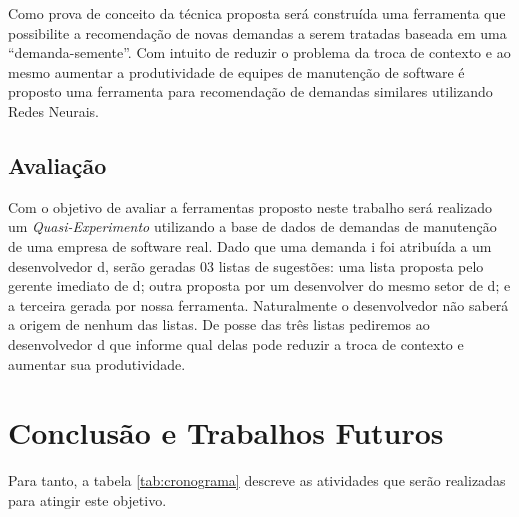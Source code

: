 \documentclass[msc,proposal,hidelot,hideabstract]{ppgccufmg} %
\begin{document}
Como prova de conceito da técnica proposta será construída uma ferramenta que
possibilite a recomendação de novas demandas a serem tratadas baseada em uma
``demanda-semente''. Com intuito de reduzir o problema da troca de contexto e
ao mesmo aumentar a produtividade de equipes de manutenção de software é
proposto uma ferramenta para recomendação de demandas similares utilizando Redes Neurais.

\section{Avaliação}
\label{sec:avaliacao}

Com o objetivo de avaliar a ferramentas proposto neste trabalho será realizado um
\textit{Quasi-Experimento} \cite{wohlin2012experimentation} utilizando a base de dados de demandas de manutenção de uma empresa
de software real. Dado que uma demanda i foi atribuída a um desenvolvedor d,
serão geradas 03 listas de sugestões: uma lista proposta pelo gerente imediato
de d; outra proposta por um desenvolver do mesmo setor de d; e a terceira
gerada por nossa ferramenta. Naturalmente o desenvolvedor não saberá a origem
de nenhum das listas.  De posse das três listas pediremos ao
desenvolvedor d que informe qual delas pode reduzir a troca de contexto e
aumentar sua produtividade.

\chapter{Conclusão e Trabalhos Futuros}
\label{ch:conclusao_trab_futuros}

Para tanto, a tabela \ref{tab:cronograma} descreve as atividades que serão realizadas para atingir este objetivo.
\end{document}
